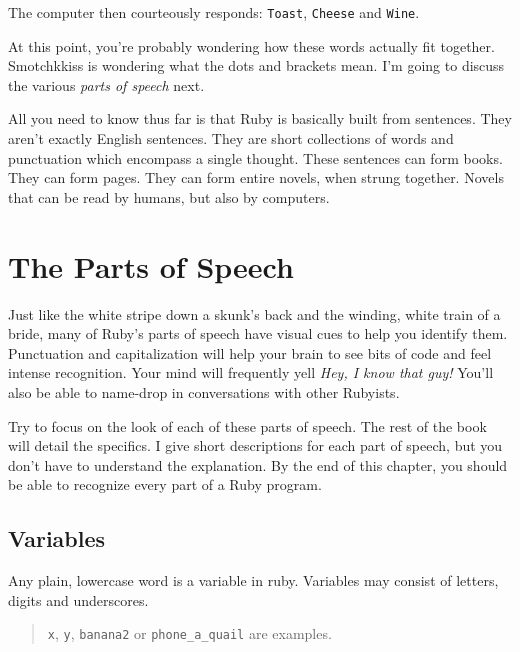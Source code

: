 \documentclass[10pt,twoside]{report}
\begin{document}
The computer then courteously responds:
\lstinline[breaklines=true]|Toast|,
\lstinline[breaklines=true]|Cheese| and
\lstinline[breaklines=true]|Wine|.

At this point, you're probably wondering how these words actually fit
together.  Smotchkkiss is wondering what the dots and brackets mean.
I'm going to discuss the various {\em parts of speech} next.

All you need to know thus far is that Ruby is basically built from
sentences.  They aren't exactly English sentences.  They are short
collections of words and punctuation which encompass a single thought.
These sentences can form books.  They can form pages.  They can form
entire novels, when strung together. Novels that can be read by
humans, but also by computers.


\section{The Parts of Speech}


Just like the white stripe down a skunk's back and the winding, white
train of a bride, many of Ruby's parts of speech have visual cues to
help you identify them.  Punctuation and capitalization will help your
brain to see bits of code and feel intense recognition. Your mind will
frequently yell {\em Hey, I know that guy!}  You'll also be able to
name-drop in conversations with other Rubyists.

Try to focus on the look of each of these parts of speech.  The rest
of the book will detail the specifics.  I give short descriptions for
each part of speech, but you don't have to understand the explanation.
By the end of this chapter, you should be able to recognize every part
of a Ruby program.



\subsection{Variables}



Any plain, lowercase word is a variable in ruby.  Variables may
consist of letters, digits and underscores.

\begin{quote}
\lstinline[breaklines=true]|x|, \lstinline[breaklines=true]|y|,
\lstinline[breaklines=true]|banana2| or
\lstinline[breaklines=true]|phone_a_quail| are examples.\end{quote}
\end{document}
